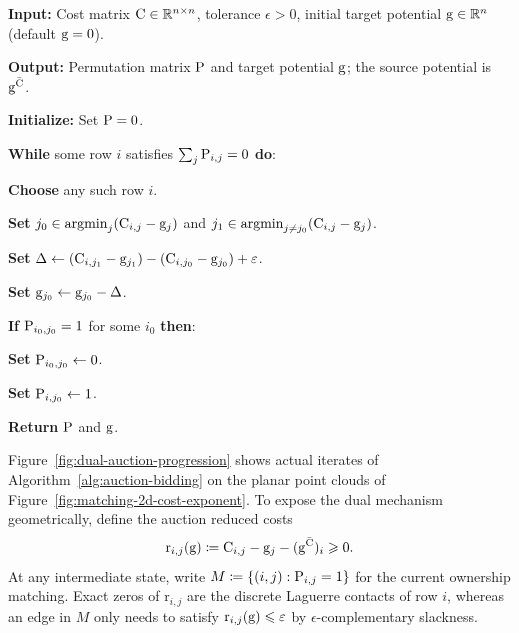 \begin{alg}\label{alg:auction-bidding}
\textbf{Input:} Cost matrix $\C\in\RR^{n\times n}$, tolerance $\epsilon>0$, initial target potential $\gD\in\RR^n$ (default $\gD=0$).

\textbf{Output:} Permutation matrix $\P$ and target potential $\gD$; the source potential is $\gD^{\bar\C}$.

\textbf{Initialize:} Set $\P=0$.

\textbf{While} some row $i$ satisfies $\sum_j\P_{i,j}=0$ \textbf{do}:
\begin{algblock}
\textbf{Choose} any such row $i$.

\textbf{Set} $j_0\in\argmin_j(\C_{i,j}-\gD_j)$ and $j_1\in\argmin_{j\neq j_0}(\C_{i,j}-\gD_j)$.

\textbf{Set} $\Delta\leftarrow(\C_{i,j_1}-\gD_{j_1})-(\C_{i,j_0}-\gD_{j_0})+\epsilon$.

\textbf{Set} $\gD_{j_0}\leftarrow\gD_{j_0}-\Delta$.

\textbf{If} $\P_{i_0,j_0}=1$ for some $i_0$ \textbf{then}:
\begin{algblock}
\textbf{Set} $\P_{i_0,j_0}\leftarrow0$.
\end{algblock}

\textbf{Set} $\P_{i,j_0}\leftarrow1$.
\end{algblock}

\textbf{Return} $\P$ and $\gD$.
\end{alg}

Figure~\ref{fig:dual-auction-progression} shows actual iterates of Algorithm~\ref{alg:auction-bidding} on the planar point clouds of Figure~\ref{fig:matching-2d-cost-exponent}. To expose the dual mechanism geometrically, define the auction reduced costs
\[
\mathrm{r}_{i,j}(\gD)
\eqdef
\C_{i,j}-\gD_j-(\gD^{\bar\C})_i
\geq 0.
\]
At any intermediate state, write
\(
	M\eqdef\{(i,j):\P_{i,j}=1\}
\)
for the current ownership matching. Exact zeros of $\mathrm{r}_{i,j}$ are the discrete Laguerre contacts of row $i$, whereas an edge in $M$ only needs to satisfy $\mathrm{r}_{i,j}(\gD)\leq\epsilon$ by $\epsilon$-complementary slackness.

